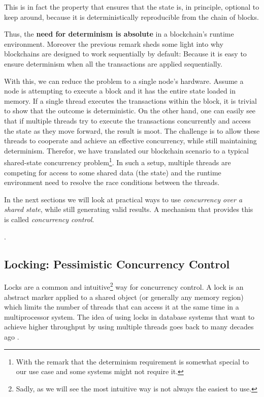 This is in fact the property that ensures that the state is, in principle, optional to keep
around, because it is deterministically reproducible from the chain of blocks.

Thus, the \textbf{need for determinism is absolute} in a blockchain's runtime environment. Moreover the
previous remark sheds some light into why blockchains are designed to work sequentially by default:
Because it is easy to ensure determinism when all the transactions are applied sequentially.

With this, we can reduce the problem to a single node's hardware. Assume a node is attempting to
execute a block and it has the entire state loaded in memory. If a single thread executes the
transactions within the block, it is trivial to show that the outcome is deterministic. On the other
hand, one can easily see that if multiple threads try to execute the transactions concurrently and
access the state as they move forward, the result is moot. The challenge is to allow these threads
to cooperate and achieve an effective concurrency, while still maintaining determinism. Therefor, we
have translated our blockchain scenario to a typical shared-state concurrency problem\footnote{With
the remark that the determinism requirement is somewhat special to our use case and some systems
might not require it.}. In such a setup, multiple threads are competing for access to some shared
data (the state) and the runtime environment need to resolve the race conditions between the
threads.

In the next sections we will look at practical ways to use \textit{concurrency over a shared state},
while still generating valid results. A mechanism that provides this is called \textit{concurrency
control}.

.

\subsection{Locking: Pessimistic Concurrency Control} \label{chap_bg:subsec:lock}

Locks are a common and intuitive\footnote{Sadly, as we will see the most intuitive way is not always
the easiest to use.} way for concurrency control. A lock is an abstract marker applied to a shared
object (or generally any memory region) which limits the number of threads that can access it at the
same time in a multiprocessor system. The idea of using locks in database systems that want to
achieve higher throughput by using multiple threads goes back to many decades ago
\cite{kedemControllingConcurrencyUsing1979, morrisPerformanceAnalysisLocking1985}.

